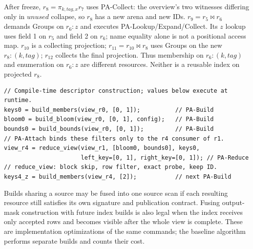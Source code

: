 After freeze, $r_8=\pi_{k,tag,x}r_7$ uses PA-Collect: the overview's two
witnesses differing only in $\mathit{unused}$ collapse, so $r_8$ has a new arena
and new IDs. $r_9=r_5\bowtie r_6$ demands Groups on $r_6:z$ and executes
PA-Lookup/Expand/Collect. Its $z$ lookup uses field 1 on $r_5$ and field 2
on $r_6$; name equality alone is not a positional access map.
$r_{10}$ is a collecting projection; $r_{11}=r_{10}\bowtie r_8$ uses Groups
on the new $r_8:(k,tag)$; $r_{12}$ collects the final projection.
Thus membership on $r_6:(k,tag)$ and enumeration on $r_6:z$ are different
resources. Neither is a reusable index on projected $r_8$.

\begin{lstlisting}[caption={Pseudocode for the first exact reduction; each operation has a named rule.}]
// Compile-time descriptor construction; values below execute at runtime.
keys0 = build_members(view_r0, [0, 1]);          // PA-Build
bloom0 = build_bloom(view_r0, [0, 1], config);   // PA-Build
bounds0 = build_bounds(view_r0, [0, 1]);         // PA-Build
// PA-Attach binds these filters only to the r4 consumer of r1.
view_r4 = reduce_view(view_r1, [bloom0, bounds0], keys0,
                      left_key=[0, 1], right_key=[0, 1]); // PA-Reduce
// reduce_view: block skip, row filter, exact probe, keep ID.
keys4_z = build_members(view_r4, [2]);           // next PA-Build
\end{lstlisting}
Builds sharing a source may be fused into one source scan if each resulting
resource still satisfies its own signature and publication contract. Fusing
output-mask construction with future index builds is also legal when the
index receives only accepted rows and becomes visible after the whole view
is complete. These are implementation optimizations of the same commands;
the baseline algorithm performs separate builds and counts their cost.

